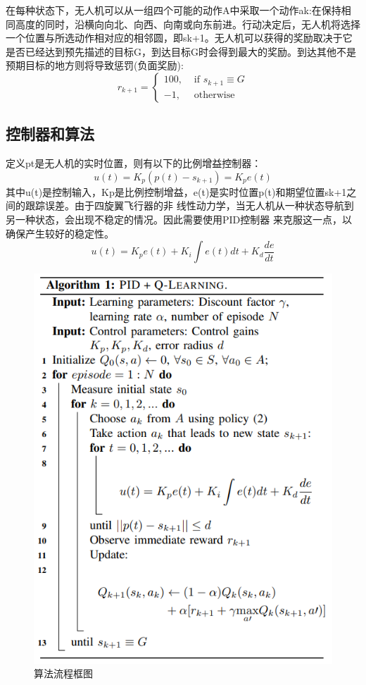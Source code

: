 \documentclass{thuemp}
\begin{document}
在每种状态下，无人机可以从一组四个可能的动作A中采取一个动作ak:在保持相同高度的同时，沿横向向北、向西、向南或向东前进。行动决定后，无人机将选择一个位置与所选动作相对应的相邻圆，即sk+1。无人机可以获得的奖励取决于它是否已经达到预先描述的目标G，到达目标G时会得到最大的奖励。到达其他不是预期目标的地方则将导致惩罚(负面奖励):
\begin{equation}\label{EQ3}
r_{k+1}=\left\{\begin{array}{ll}
100, & \text { if } s_{k+1} \equiv G \\
-1, & \text { otherwise }
\end{array}\right.
\end{equation}

\subsection{控制器和算法}
定义pt是无人机的实时位置，则有以下的比例增益控制器：
\begin{equation}
    u(t)=K_{p}\left(p(t)-s_{k+1}\right)=K_{p} e(t)
\end{equation}
其中u(t)是控制输入，Kp是比例控制增益，e(t)是实时位置p(t)和期望位置sk+1之间的跟踪误差。由于四旋翼飞行器的非
线性动力学，当无人机从一种状态导航到另一种状态，会出现不稳定的情况。因此需要使用PID控制器\cite{2016Modern}
来克服这一点，以确保产生较好的稳定性。
\begin{equation}
    u(t)=K_{p} e(t)+K_{i} \int e(t) d t+K_{d} \frac{d e}{d t}
\end{equation}
\begin{figure}[H]
\centering
\includegraphics[width=1\linewidth]{./image/fig (5).png}
\caption{算法流程框图} \label{fig:2}
\end{figure}
\end{document}

